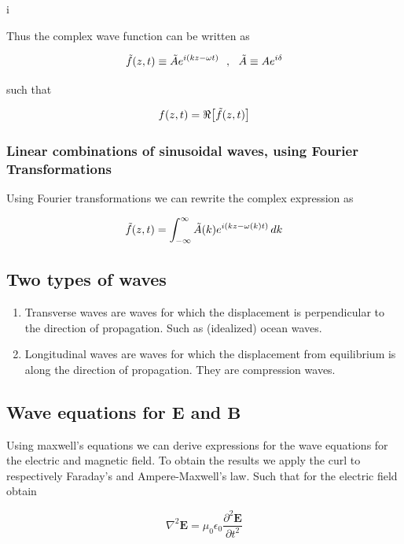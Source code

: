 i\documentclass[a4paper]{article}
\begin{document}
Thus the complex wave function can be written as

\begin{equation}
    \Tilde{f}(z, t)\equiv \Tilde{A}e^{i(kz-\omega t)}\ \ , \ \ \Tilde{A}\equiv Ae^{i\delta}
\end{equation}

such that

\begin{equation}
    f(z, t) = \Re\big[\Tilde{f}(z, t)\big]
\end{equation}

\subsubsection*{Linear combinations of sinusoidal waves, using Fourier Transformations}

Using Fourier transformations we can rewrite the complex expression as

\begin{equation}
    \Tilde{f}(z, t) =\int_{-\infty}^{\infty} \Tilde{A}(k)e^{i(kz-\omega(k)t)}\,dk
\end{equation}

\subsection{Two types of waves}

\begin{enumerate}
    \item Transverse waves are waves for which the displacement is perpendicular to the direction of propagation. Such as (idealized) ocean waves.
    \item Longitudinal waves are waves for which the displacement from equilibrium is along the direction of propagation. They are compression waves.
\end{enumerate}

\subsection{Wave equations for $\bm{E}$ and $\bm{B}$}

Using maxwell's equations we can derive expressions for the wave equations for the electric and magnetic field. To obtain the results we apply the curl to respectively Faraday's and Ampere-Maxwell's law. Such that for the electric field obtain

\begin{equation}
    \nabla^2\bm{E}=\mu_0\epsilon_0\frac{\partial^2\bm{E}}{\partial t^2}
\end{equation}
\end{document}
